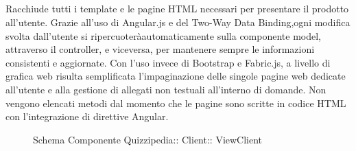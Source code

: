\subsection{}
Racchiude tutti i template e le pagine HTML necessari per presentare il prodotto all'utente. Grazie all'uso di Angular.js e del Two-Way Data Binding,ogni modifica svolta dall'utente si ripercuoteràautomaticamente sulla componente model, attraverso il controller, e viceversa, per mantenere sempre le informazioni consistenti e aggiornate. Con l'uso invece di Bootstrap e Fabric.js, a livello di grafica web risulta semplificata l'impaginazione delle singole pagine web dedicate all'utente e alla gestione di allegati non testuali all'interno di domande. Non vengono elencati metodi dal momento che le pagine sono scritte in codice HTML con l'integrazione di direttive Angular.
\begin{figure}[H]
\centering
\noindent{}
\caption[Schema Componente ViewClient]{Schema Componente Quizzipedia:: Client:: ViewClient}
\end{figure}
